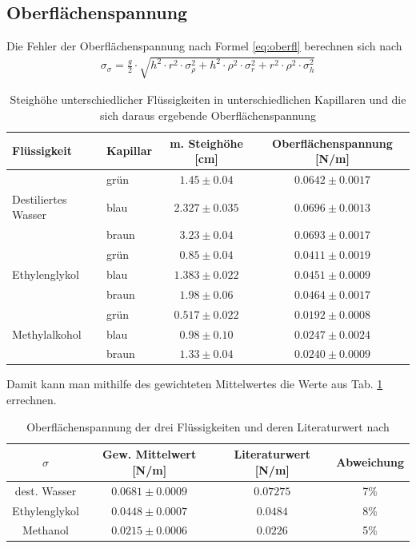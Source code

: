 \documentclass[12pt,a4paper,titlepage,headinclude,bibtotoc]{scrartcl}
\begin{document}
\subsection{Oberflächenspannung}
Die Fehler der Oberflächenspannung nach Formel \eqref{eq:oberfl} berechnen sich nach
\begin{align*}
\sigma_{\sigma}=\frac{g}{2} \cdot \sqrt{h^{2} \cdot r^{2} \cdot \sigma_{\rho}^{2} + h^{2} \cdot \rho^{2} \cdot \sigma_{r}^{2} + r^{2} \cdot \rho^{2} \cdot \sigma_{h}^{2}}
\end{align*}
\begin{table}[!h]
\centering
\begin{tabular}{|l|l|c|c|}
\hline
Flüssigkeit 	     &Kapillar 	& m. Steighöhe [cm]		& Oberflächenspannung [N/m]\\\hline\hline
				&grün	& $1.45\pm 0.04$	&$ 0.0642 \pm 0.0017 $\\
Destiliertes Wasser		&blau	& $2.327\pm 0.035$	&$ 0.0696 \pm 0.0013 $\\
            			&braun	& $3.23\pm 0.04$	&$ 0.0693 \pm 0.0017 $\\\hline
				&grün	& $0.85\pm 0.04$	&$ 0.0411 \pm 0.0019 $\\
Ethylenglykol			&blau	& $1.383\pm 0.022$	&$ 0.0451 \pm 0.0009 $\\
				&braun	& $1.98\pm 0.06$	&$ 0.0464 \pm 0.0017 $\\\hline
				&grün	& $0.517\pm 0.022$	&$ 0.0192 \pm 0.0008 $\\
Methylalkohol			&blau	& $0.98\pm 0.10$	&$ 0.0247 \pm 0.0024 $\\
				&braun	& $1.33\pm 0.04$	&$ 0.0240 \pm 0.0009 $\\
\hline
\end{tabular}
\caption{Steighöhe unterschiedlicher Flüssigkeiten in unterschiedlichen Kapillaren und die sich daraus ergebende Oberflächenspannung}
\end{table}
Damit kann man mithilfe des gewichteten Mittelwertes die Werte aus Tab. \ref{tab:sigma} errechnen.\\
\begin{table}[!h]
\centering
\begin{tabular}{|c||c|c|c|}
\hline
$\sigma$ 		& Gew. Mittelwert [\si{\newton/\meter}]	& Literaturwert [\si{\newton/\meter}]	& Abweichung\\\hline\hline
dest. Wasser 		& $ 0.0681 \pm 0.0009 $			&$0.07275$				&7\%	\\\hline 
Ethylenglykol 		& $ 0.0448 \pm 0.0007 $			&$0.0484$				&8\%	\\\hline 
Methanol		& $ 0.0215 \pm 0.0006 $			&$0.0226$				&5\%	\\ 
\hline 
\end{tabular} 
\caption{Oberflächenspannung der drei Flüssigkeiten und deren Literaturwert nach \protect\footnotemark\label{tab:sigma}}
\end{table}
\end{document}
